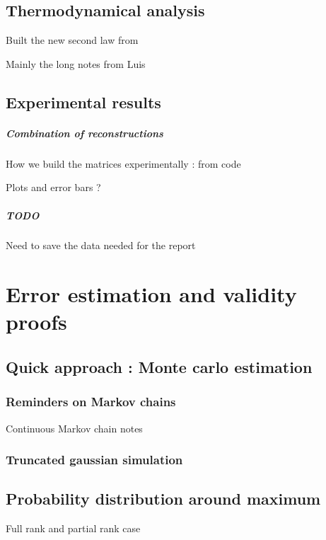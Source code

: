 \documentclass[10pt]{report}
\theoremstyle{plain}
\theoremstyle{definition}
\theoremstyle{remark}
\begin{document}
\section{Thermodynamical analysis}

Built the new second law from

Mainly the long notes from Luis


\section{Experimental results}

\paragraph{Combination of reconstructions} How we build the matrices
experimentally : from code

Plots and error bars ?

\paragraph{TODO} Need to save the data needed for the report

\chapter{Error estimation and validity proofs}
\section{Quick approach : Monte carlo estimation}
\subsection{Reminders on Markov chains}

Continuous Markov chain notes

\subsection{Truncated gaussian simulation}

\section{Probability distribution around maximum}

Full rank and partial rank case
\end{document}
